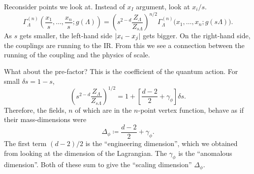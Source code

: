 Reconsider points we look at. Instead of $x_I$ argument, look at $x_i / s$. 
\begin{equation}
  \Gamma_\Lambda^{(n)} (\frac{x_1}{s}, \dots, \frac{x_n}{s}; g(\Lambda)) = \left( s^{2 - d} \frac{Z_\Lambda}{Z_{s\Lambda}} \right)^{n / 2} \Gamma_\Lambda^{(n)} \bigl( x_1, \dots, x_n ; g(s \Lambda) \bigr).
\end{equation}
As $s$ gets smaller, the left-hand side $\abs{x_i - x_j}$ gets bigger.
On the right-hand side, the couplings are running to the IR.
From this we see a connection between the running of the coupling and the physics of scale.

What about the pre-factor?
This is the coefficient of the quantum action.
For small $\delta s = 1 - s$, 
\begin{equation}
  \left( s^{2 - d} \frac{Z_\Lambda}{Z_{s \Lambda}} \right)^{1 / 2} = 1 + \left[ \frac{d - 2}{2} + \gamma_\phi \right] \delta s.
\end{equation}
Therefore, the fields, $n$ of which are in the $n$-point vertex function, behave as if their mass-dimensions were
\begin{equation}
  \Delta_\phi \coloneqq \frac{d - 2}{2} + \gamma_\phi.
\end{equation}
The first term $(d - 2) / 2$ is the ``engineering dimension'', which we obtained from looking at the dimension of the Lagrangian. The $\gamma_\phi$ is the ``anomalous dimension''.
Both of these sum to give the ``scaling dimension'' $\Delta_\phi$.
